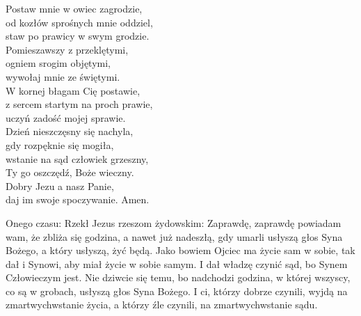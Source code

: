 \documentclass[10pt,a5paper]{mszalik}
\begin{document}
{Postaw mnie w owiec zagrodzie,\\
od kozłów sprośnych mnie oddziel,\\
staw po prawicy w swym grodzie.\\

Pomieszawszy z przeklętymi,\\
ogniem srogim objętymi,\\
wywołaj mnie ze świętymi.\\

W kornej błagam Cię postawie,\\
z sercem startym na proch prawie,\\
uczyń zadość mojej sprawie.\\

Dzień nieszczęsny się nachyla,\\
gdy rozpęknie się mogiła,\\
wstanie na sąd człowiek grzeszny,\\
Ty go oszczędź, Boże wieczny.\\

Dobry Jezu a nasz Panie,\\
daj im swoje spoczywanie. Amen. \\
}



{Onego czasu: Rzekł Jezus rzeszom żydowskim: Zaprawdę, zaprawdę powiadam wam,
	że zbliża się godzina, a nawet już nadeszłą, gdy umarli usłyszą głos Syna
	Bożego, a który usłyszą, żyć będą. Jako bowiem Ojciec ma życie sam w sobie,
	tak dał i Synowi, aby miał życie w sobie samym. I dał władzę czynić sąd, bo
	Synem Człowieczym jest. Nie dziwcie się temu, bo nadchodzi godzina, w której
	wszyscy, co są w grobach, usłyszą głos Syna Bożego. I ci, którzy dobrze
	czynili, wyjdą na zmartwychwstanie życia, a którzy źle czynili, na
zmartwychwstanie sądu. }
\end{document}

